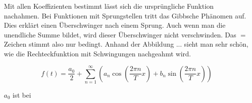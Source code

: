 Mit allen Koeffizienten bestimmt lässt sich die ursprüngliche Funktion nachahmen.
Bei Funktionen mit Sprungstellen tritt das Gibbsche Phänomen auf.
Dies erklärt einen Überschwinger nach einem Sprung. Auch wenn man die unendliche Summe bildet, wird dieser Überschwinger nicht verschwinden.
Das $=$ Zeichen stimmt also nur bedingt.
Anhand der Abbildung ... sieht man sehr schön, wie die Rechteckfunktion mit Schwingungen nachgeahmt wird.

\[
f(t) = \frac{a_0}{2} + \sum_{n=1}^{\infty} \left( a_n \cos\left( \frac{2\pi n}{T} x \right) + b_n \sin\left( \frac{2\pi n}{T} x \right) \right)
\]


$a_0$ ist bei 




